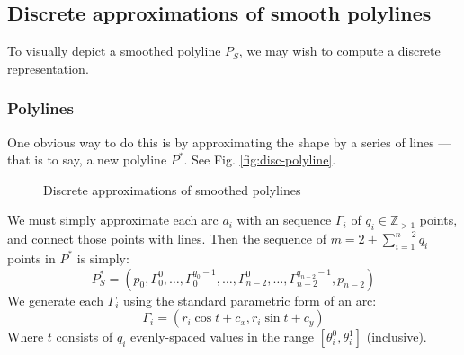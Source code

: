 \documentclass{article}
\begin{document}
\subsection{Discrete approximations of smooth polylines}
%
To visually depict a smoothed polyline $P_S$, we may wish to compute a discrete representation.
%
\subsubsection{Polylines}
%
One obvious way to do this is by approximating the shape by a series of lines --- that is to say, a new polyline $P^*$.  See Fig. \ref{fig:disc-polyline}.
%
\begin{figure}
  \centering
  \hfill
  \caption{Discrete approximations of smoothed polylines}
\end{figure}
%
We must simply approximate each arc $a_i$ with an sequence $\Gamma_i$ of $q_i \in \mathbb{Z}_{>1}$ points, and connect those points with lines.  Then the sequence of $m = 2 + \sum^{n-2}_{i=1} q_i$ points in $P^*$ is simply:
%
\begin{equation}
  \label{eq:p-star}
  P^*_S = \left(p_0, \Gamma^0_0, \ldots, \Gamma^{q_0-1}_0, \ldots, \Gamma^{0}_{n-2}, \ldots, \Gamma^{q_{n-2}-1}_{n-2},  p_{n-2}\right)
\end{equation}
%
We generate each $\Gamma_i$ using the standard parametric form of an arc:
%
\begin{equation}
  \label{eq:arc-segments}
  \Gamma_i = \left(r_i \cos t + c_x, r_i \sin t + c_y\right)
\end{equation}
%
Where $t$ consists of $q_i$ evenly-spaced values in the range $\left[\theta^0_i, \theta^1_i\right]$ (inclusive).
%
\end{document}
